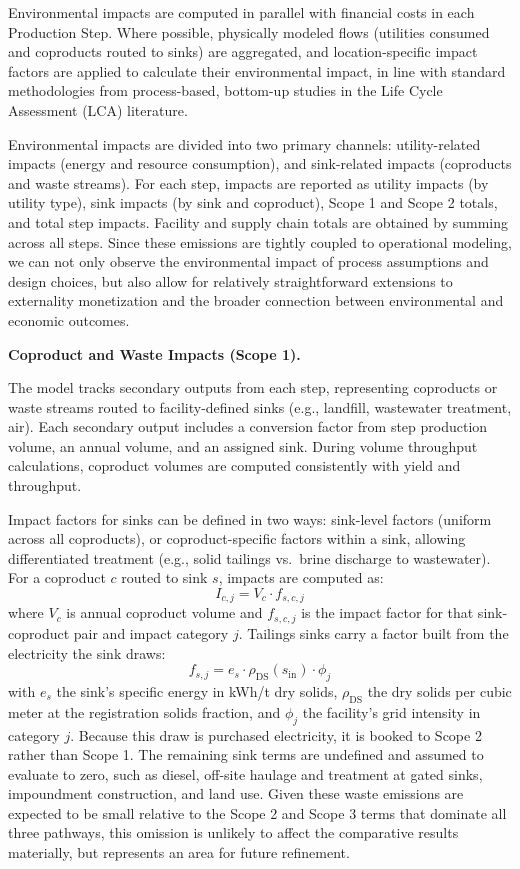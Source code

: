 \documentclass{article}
\renewcommand\_{\textunderscore\allowbreak}
\begin{document}
Environmental impacts are computed in parallel with financial costs in each Production Step. Where possible, physically modeled flows (utilities consumed and coproducts routed to sinks) are aggregated, and location-specific impact factors are applied to calculate their environmental impact, in line with standard methodologies from process-based, bottom-up studies in the Life Cycle Assessment (LCA) literature.

Environmental impacts are divided into two primary channels: utility-related impacts (energy and resource consumption), and sink-related impacts (coproducts and waste streams). For each step, impacts are reported as utility impacts (by utility type), sink impacts (by sink and coproduct), Scope 1 and Scope 2 totals, and total step impacts. Facility and supply chain totals are obtained by summing across all steps. Since these emissions are tightly coupled to operational modeling, we can not only observe the environmental impact of process assumptions and design choices, but also allow for relatively straightforward extensions to externality monetization and the broader connection between environmental and economic outcomes.

\medskip
\noindent\textbf{Coproduct and Waste Impacts (Scope 1).}\quad

The model tracks secondary outputs from each step, representing coproducts or waste streams routed to facility-defined sinks (e.g., landfill, wastewater treatment, air). Each secondary output includes a conversion factor from step production volume, an annual volume, and an assigned sink. During volume throughput calculations, coproduct volumes are computed consistently with yield and throughput.

Impact factors for sinks can be defined in two ways: sink-level factors (uniform across all coproducts), or coproduct-specific factors within a sink, allowing differentiated treatment (e.g., solid tailings vs.\ brine discharge to wastewater). For a coproduct $c$ routed to sink $s$, impacts are computed as:
\begin{equation}
    I_{c,j} = V_c \cdot f_{s,c,j}
\end{equation}
where $V_c$ is annual coproduct volume and $f_{s,c,j}$ is the impact factor for that sink-coproduct pair and impact category $j$. Tailings sinks carry a factor built from the electricity the sink draws: 
\begin{equation}
    f_{s,j} = e_s \cdot \rho_{\mathrm{DS}}(s_{\mathrm{in}}) \cdot \phi_j
\end{equation}
with $e_s$ the sink's specific energy in \si{kWh/t} dry solids, $\rho_{\mathrm{DS}}$ the dry solids per cubic meter at the registration solids fraction, and $\phi_j$ the facility's grid intensity in category $j$. Because this draw is purchased electricity, it is booked to Scope 2 rather than Scope 1. The remaining sink terms are undefined and assumed to evaluate to zero, such as diesel, off-site haulage and treatment at gated sinks, impoundment construction, and land use. Given these waste emissions are expected to be small relative to the Scope 2 and Scope 3 terms that dominate all three pathways, this omission is unlikely to affect the comparative results materially, but represents an area for future refinement. 
\end{document}
